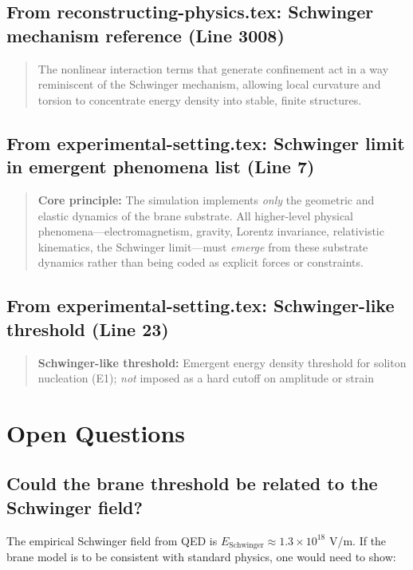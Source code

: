 \documentclass[11pt,a4paper]{article}
\begin{document}
\subsection{From reconstructing-physics.tex: Schwinger mechanism reference (Line 3008)}

\begin{quote}
The nonlinear interaction terms that generate confinement act in a way
reminiscent of the Schwinger mechanism, allowing local curvature and
torsion to concentrate energy density into stable, finite structures.
\end{quote}

\subsection{From experimental-setting.tex: Schwinger limit in emergent phenomena list (Line 7)}

\begin{quote}
\textbf{Core principle:} The simulation implements \emph{only} the geometric and elastic dynamics of the brane substrate. All higher-level physical phenomena—electromagnetism, gravity, Lorentz invariance, relativistic kinematics, the Schwinger limit—must \emph{emerge} from these substrate dynamics rather than being coded as explicit forces or constraints.
\end{quote}

\subsection{From experimental-setting.tex: Schwinger-like threshold (Line 23)}

\begin{quote}
\textbf{Schwinger-like threshold:} Emergent energy density threshold for soliton nucleation (E1); \emph{not} imposed as a hard cutoff on amplitude or strain
\end{quote}

\section{Open Questions}

\subsection{Could the brane threshold be related to the Schwinger field?}

The empirical Schwinger field from QED is $E_{\text{Schwinger}} \approx 1.3 \times 10^{18}$ V/m.
If the brane model is to be consistent with standard physics, one would need to show:
\end{document}
